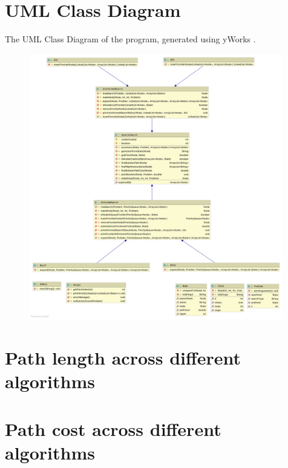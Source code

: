\documentclass[letterpaper,12pt]{article}
\begin{document}
\newpage
\begin{appendices}

\section{UML Class Diagram}
\label{sec:uml_class_diagram}

The UML Class Diagram of the program, generated using yWorks \cite{yworks}.

\begin{figure}[ht]
\centering
\includegraphics[width=0.99\textwidth]{UML/UML_class_diagram.png}
{\label{fig:uml_class_diagram}}
\end{figure}

\newpage
\section{Path length across different algorithms}
\label{sec:appendix-path-length}


\section{Path cost across different algorithms}
\label{sec:appendix-path-cost}



\end{appendices}
\end{document}
